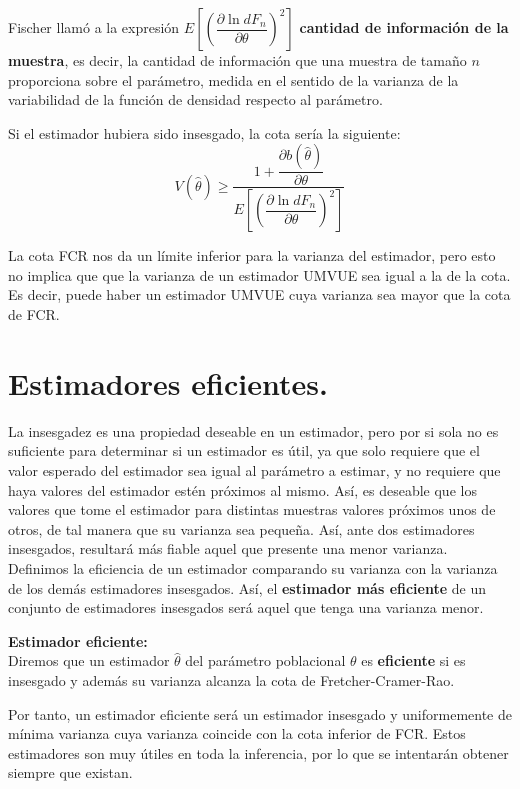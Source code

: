 Fischer llam\'o a la expresi\'on $E\left[\left(\dfrac{\partial\ln{dF_n}}{\partial\theta}\right)^2\right]$ \textbf{cantidad de informaci\'on de la muestra}, es decir, la cantidad de informaci\'on que una muestra de tama\~no $n$ proporciona sobre el par\'ametro, medida en el sentido de la varianza de la variabilidad de la funci\'on de densidad respecto al par\'ametro.

Si el estimador hubiera sido insesgado, la cota ser\'ia la siguiente:
\begin{equation*}
V(\hat{\theta})\geq \dfrac{1+\dfrac{\partial b(\hat{\theta})}{\partial\theta}}{E\left[\left(\dfrac{\partial\ln{dF_n}}{\partial\theta}\right)^2\right]}
\end{equation*}

La cota FCR nos da un l\'imite inferior para la varianza del estimador, pero esto no implica que que la varianza de un estimador UMVUE sea igual a la de la cota. Es decir, puede haber un estimador UMVUE cuya varianza sea mayor que la cota de FCR.

\section{Estimadores eficientes.}

La insesgadez es una propiedad deseable en un estimador, pero por si sola no es suficiente para determinar si un estimador es \'util, ya que solo requiere que el valor esperado del estimador sea igual al par\'ametro a estimar, y no requiere que haya valores del estimador est\'en pr\'oximos al mismo. Así, es deseable que los valores que tome el estimador para distintas muestras valores pr\'oximos unos de otros, de tal manera que su varianza sea peque\~na. Así, ante dos estimadores insesgados, resultar\'a m\'as fiable aquel que presente una menor varianza. Definimos la eficiencia de un estimador comparando su varianza con la varianza de los dem\'as estimadores insesgados. As\'i, el \textbf{estimador m\'as eficiente} de un conjunto de estimadores insesgados ser\'a aquel que tenga una varianza menor.

\begin{definicion}
\textbf{Estimador eficiente:}\\
Diremos que un estimador $\hat{\theta}$ del par\'ametro poblacional $\theta$ es \textbf{eficiente} si es insesgado y adem\'as su varianza alcanza la cota de Fretcher-Cramer-Rao.
\end{definicion}

Por tanto, un estimador eficiente ser\'a un estimador insesgado y uniformemente de m\'inima varianza cuya varianza coincide con la cota inferior de FCR. Estos estimadores son muy \'utiles en toda la inferencia, por lo que se intentar\'an obtener siempre que existan.

